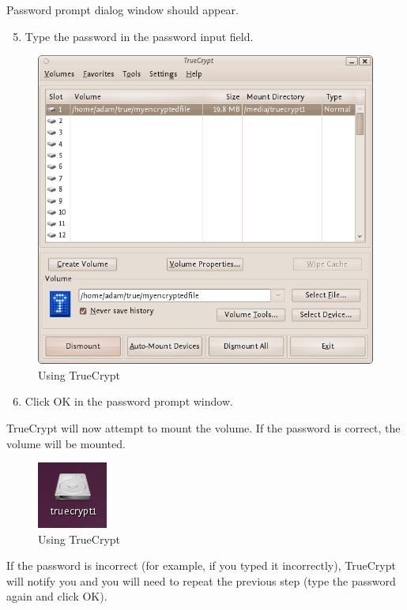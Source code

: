 Password prompt dialog window should appear.

\begin{enumerate}[1.]
\setcounter{enumi}{4}
\item
  Type the password in the password input field.
\end{enumerate}
\begin{figure}[htbp]
\centering
\includegraphics{using_tc_015.png}
\caption{Using TrueCrypt}
\end{figure}

\begin{enumerate}[1.]
\setcounter{enumi}{5}
\item
  Click OK in the password prompt window.
\end{enumerate}
TrueCrypt will now attempt to mount the volume. If the password is
correct, the volume will be mounted.

\begin{figure}[htbp]
\centering
\includegraphics{using_tc_016.png}
\caption{Using TrueCrypt}
\end{figure}

If the password is incorrect (for example, if you typed it incorrectly),
TrueCrypt will notify you and you will need to repeat the previous step
(type the password again and click OK).

